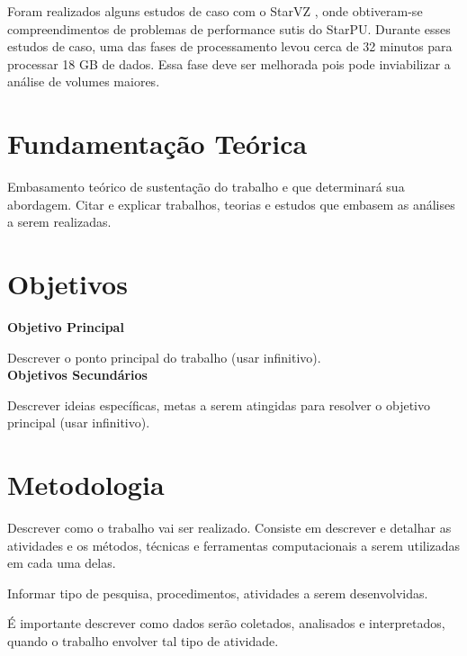 \documentclass[prop-esp]{iiufrgs}
\begin{document}
Foram realizados alguns estudos de caso com o StarVZ \cite{}, onde obtiveram-se compreendimentos de problemas de performance sutis do StarPU. Durante
esses estudos de caso, uma das fases de processamento levou cerca de 32 minutos para processar 18 GB de dados. Essa fase deve ser melhorada pois pode inviabilizar a análise de volumes maiores.






%
\chapter{Fundamentação Teórica}

Embasamento teórico de sustentação do trabalho e que determinará sua abordagem. Citar e explicar trabalhos, teorias e estudos que embasem as análises a serem realizadas. 


%
\chapter{Objetivos}

\noindent \textbf{Objetivo Principal} 

Descrever o ponto principal do trabalho (usar infinitivo). \\


\noindent \textbf{Objetivos Secundários} 

Descrever ideias específicas, metas a serem atingidas para resolver o objetivo principal (usar infinitivo).


%
\chapter{Metodologia}

Descrever como o trabalho vai ser realizado. Consiste em descrever e detalhar as atividades e os métodos, técnicas e ferramentas computacionais a serem utilizadas em cada uma delas. 

Informar tipo de pesquisa, procedimentos, atividades a serem desenvolvidas.

É importante descrever como dados serão coletados, analisados e interpretados, quando o trabalho envolver tal tipo de atividade.
\end{document}
